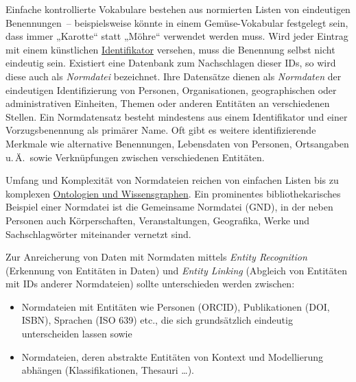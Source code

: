 \documentclass[
  11pt,
  letterpaper,
  DIV=11,
  twoside]{scrreprt}
\begin{document}
Einfache kontrollierte Vokabulare bestehen aus normierten Listen von
eindeutigen Benennungen~-- beispielsweise könnte in einem
Gemüse-Vokabular festgelegt sein, dass immer „Karotte`` statt „Möhre``
verwendet werden muss. Wird jeder Eintrag mit einem künstlichen
\hyperref[identifikatoren]{Identifikator} versehen, muss die Benennung
selbst nicht eindeutig sein. Existiert eine Datenbank zum Nachschlagen
dieser IDs, so wird diese auch als \emph{Normdatei} bezeichnet. Ihre
Datensätze dienen als \emph{Normdaten} der eindeutigen Identifizierung
von Personen, Organisationen, geographischen oder administrativen
Einheiten, Themen oder anderen Entitäten an verschiedenen Stellen. Ein
Normdatensatz besteht mindestens aus einem Identifikator und einer
Vorzugsbenennung als primärer Name. Oft gibt es weitere identifizierende
Merkmale wie alternative Benennungen, Lebensdaten von Personen,
Ortsangaben u.\,Ä.~sowie Verknüpfungen zwischen verschiedenen Entitäten.

\begin{tcolorbox}[enhanced jigsaw, leftrule=.75mm, toprule=.15mm, left=2mm, opacityback=0, arc=.35mm, colback=white, breakable, colframe=quarto-callout-tip-color-frame, rightrule=.15mm, bottomrule=.15mm]
\begin{minipage}[t]{5.5mm}
\textcolor{quarto-callout-tip-color}{\faLightbulb}
\end{minipage}%
\begin{minipage}[t]{\textwidth - 5.5mm}

Umfang und Komplexität von Normdateien reichen von einfachen Listen bis
zu komplexen \hyperref[datenmodelle-und-ontologien]{Ontologien und
Wissensgraphen}. Ein prominentes bibliothekarisches Beispiel einer
Normdatei ist die Gemeinsame Normdatei ({GND}), in der neben Personen
auch Körperschaften, Veranstaltungen, Geografika, Werke und
Sachschlagwörter miteinander vernetzt sind.

\end{minipage}%
\end{tcolorbox}

Zur Anreicherung von Daten mit Normdaten mittels \emph{Entity
Recognition} (Erkennung von Entitäten in Daten) und \emph{Entity
Linking} (Abgleich von Entitäten mit IDs anderer Normdateien) sollte
unterschieden werden zwischen:

\begin{itemize}
\item
  Normdateien mit Entitäten wie Personen (ORCID), Publikationen (DOI,
  ISBN), Sprachen (ISO 639) etc., die sich grundsätzlich eindeutig
  unterscheiden lassen sowie
\item
  Normdateien, deren abstrakte Entitäten von Kontext und Modellierung
  abhängen (Klassifikationen, Thesauri \ldots).
\end{itemize}
\end{document}
